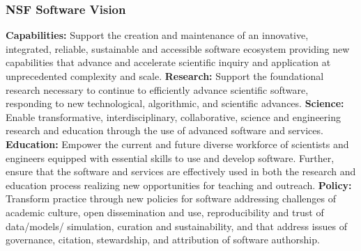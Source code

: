 \begin{frame}
\frametitle{NSF Software Vision}

\scriptsize{
\textbf{Capabilities:} Support the creation and maintenance of an innovative, integrated, reliable, sustainable and accessible software ecosystem providing new capabilities that advance and accelerate scientific inquiry and application at unprecedented complexity and scale.
\vskip 0.15in
\textbf{Research:} Support the foundational research necessary to continue to efficiently advance scientific software, responding to new technological, algorithmic, and scientific advances.
\vskip 0.15in
\textbf{Science:} Enable transformative, interdisciplinary, collaborative, science and engineering research and education through the use of advanced software and services.
\vskip 0.15in
\textbf{Education:} Empower the current and future diverse workforce of scientists and engineers equipped with essential skills to use and develop software. Further, ensure that the software and services are effectively used in both the research and education process realizing new opportunities for teaching and outreach.
\vskip 0.15in
\textbf{Policy:} Transform practice through new policies for software addressing challenges of academic culture, open dissemination and use, reproducibility and trust of data/models/ simulation, curation and sustainability, and that address issues of governance, citation, stewardship, and attribution of software authorship.
}

\end{frame}


